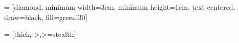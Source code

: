  = [diamond, minimum width=3cm, minimum height=1cm, text centered, draw=black, fill=green!30]

 = [thick,->,>=stealth]

\usepackage[colorlinks=true, linkcolor=blue, citecolor=blue, plainpages=false, pdfpagelabels=true, urlcolor=blue]{hyperref}
\usepackage[nameinlink]{cleveref}
